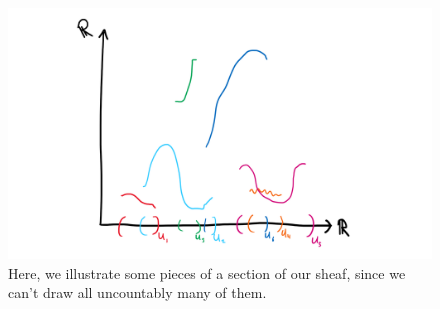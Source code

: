 \documentclass{tufte-handout}
\begin{document}
\begin{figure}[h!]
    \centering
    \includegraphics{sectiononR.png}
    \caption{Here, we illustrate some pieces of a section of our sheaf, since we can't draw all uncountably many of them.}
    \label{fig:sectiononR}
\end{figure}
\FloatBarrier
\end{document}
